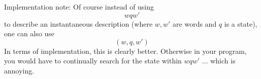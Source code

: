   Implementation note:
  Of course instead of using
\[
 w q w'
\]
to describe an instantaneous description
(where $w,w'$ are words and $q$ is a state),
one can also use
\[
 (w, q, w')
\]
In terms of implementation, this is clearly better.
Otherwise in your program, you would have to continually search for
the state within $wqw'$ ... which is annoying.
